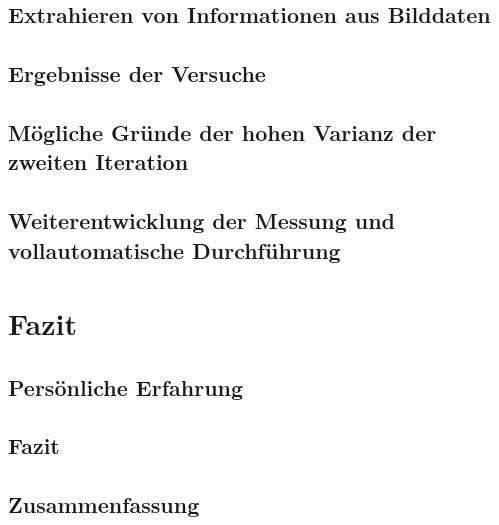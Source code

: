 \documentclass[a4paper,12pt]{article}
\begin{document}
\subsection{Extrahieren von Informationen aus Bilddaten}
\label{sec:DB}



\newpage
\subsection{Ergebnisse der Versuche}

\newpage
\subsection{Mögliche Gründe der hohen Varianz der zweiten Iteration}

%

%
\newpage
\subsection{Weiterentwicklung der Messung und vollautomatische Durchführung}


\newpage
\section{Fazit}
%

\subsection{Persönliche Erfahrung}


\newpage
\subsection{Fazit}


\newpage
\subsection{Zusammenfassung}

\end{document}
